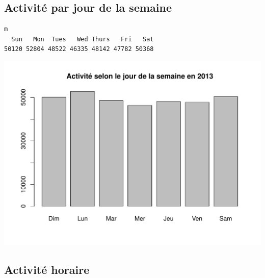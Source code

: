 \documentclass[12pt,english,french,twoside]{book}\usepackage[]{graphicx}\usepackage[]{color}
\makeatletter
\def\maxwidth{ %
  \ifdim\Gin@nat@width>\linewidth
    \linewidth
  \else
    \Gin@nat@width
  \fi
}
\newenvironment{kframe}{%
 \def\at@end@of@kframe{}%
 \ifinner\ifhmode%
  \def\at@end@of@kframe{\end{minipage}}%
  \begin{minipage}{\columnwidth}%
 \fi\fi%
 \def\FrameCommand##1{\hskip\@totalleftmargin \hskip-\fboxsep
 \colorbox{shadecolor}{##1}\hskip-\fboxsep
     \hskip-\linewidth \hskip-\@totalleftmargin \hskip\columnwidth}%
 \MakeFramed {\advance\hsize-\width
   \@totalleftmargin\z@ \linewidth\hsize
   \@setminipage}}%
 {\par\unskip\endMakeFramed%
 \at@end@of@kframe}
\newenvironment{knitrout}{}{} %
\makeatother
\begin{document}
\subsection*{Activité par jour de la semaine}

\begin{knitrout}
\color{fgcolor}\begin{kframe}
\begin{verbatim}
m
  Sun   Mon  Tues   Wed Thurs   Fri   Sat 
50120 52804 48522 46335 48142 47782 50368 
\end{verbatim}
\end{kframe}
\end{knitrout}


\begin{center}
\begin{knitrout}
\color{fgcolor}
\includegraphics[width=\maxwidth]{figure/bp_activite_semaine} 

\end{knitrout}

\label{fig:activite_semaine}
\end{center}

\subsection*{Activité horaire}
\end{document}
